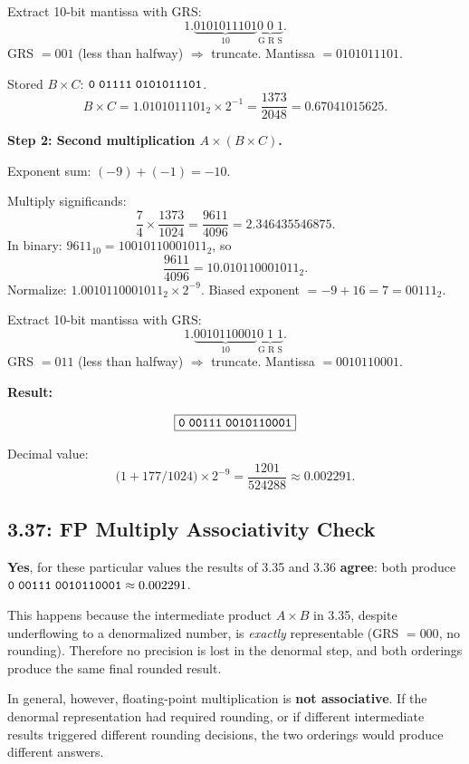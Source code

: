 Extract 10-bit mantissa with GRS:
\[
  1.\underbrace{0101011101}_{10}\underbrace{0\;0\;1}_{\text{G R S}}.
\]
GRS $= 001$ (less than halfway) $\Rightarrow$ truncate.
Mantissa $= 0101011101$.

Stored $B \times C$: $\texttt{0\;01111\;0101011101}$.
\[
  B \times C = 1.0101011101_2 \times 2^{-1}
  = \frac{1373}{2048}
  = 0.67041015625.
\]

\noindent\textbf{Step 2: Second multiplication $A \times (B \times C)$.}

Exponent sum: $(-9) + (-1) = -10$.

Multiply significands:
\[
  \frac{7}{4} \times \frac{1373}{1024}
  = \frac{9611}{4096}
  = 2.346435546875.
\]
In binary: $9611_{10} = 10010110001011_2$, so
\[
  \frac{9611}{4096} = 10.010110001011_2.
\]
Normalize: $1.0010110001011_2 \times 2^{-9}$.
Biased exponent $= -9 + 16 = 7 = 00111_2$.

Extract 10-bit mantissa with GRS:
\[
  1.\underbrace{0010110001}_{10}\underbrace{0\;1\;1}_{\text{G R S}}.
\]
GRS $= 011$ (less than halfway) $\Rightarrow$ truncate.
Mantissa $= 0010110001$.

\medskip\noindent\textbf{Result:}

\[
  \boxed{\texttt{0\;00111\;0010110001}}
\]

Decimal value:
\[
  \bigl(1 + 177/1024\bigr) \times 2^{-9}
  = \frac{1201}{524288}
  \approx \mathbf{0.002291}.
\]

\subsection*{3.37: FP Multiply Associativity Check}
\hypertarget{sol-3.37}{}

\textbf{Yes}, for these particular values the results of 3.35 and 3.36
\textbf{agree}: both produce $\texttt{0\;00111\;0010110001} \approx 0.002291$.

This happens because the intermediate product $A \times B$ in 3.35, despite
underflowing to a denormalized number, is \emph{exactly} representable (GRS
$= 000$, no rounding). Therefore no precision is lost in the denormal step, and
both orderings produce the same final rounded result.

In general, however, floating-point multiplication is \textbf{not associative}.
If the denormal representation had required rounding, or if different
intermediate results triggered different rounding decisions, the two orderings
would produce different answers.

